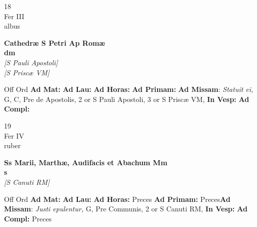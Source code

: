 \documentclass[10pt, openany]{book}
\begin{document}
        \begin{center}
            \begin{minipage}{3.5in}
                \vspace{2em}
                \begin{minipage}{0.5in}
                    {\Huge 18} \\
                    {\normalsize Fer III} \\
                    {\normalsize albus}
                \end{minipage}
                \begin{minipage}{3.0in}
                    \textbf{ \large Cathedræ S Petri Ap Romæ \\
                    \textnormal{\normalsize dm}} \\ \textit{[S Pauli Apostoli]} \\ \textit{[S Priscæ VM]} \\ 
                \end{minipage}
                \begin{justify}Off Ord
                    \textbf{Ad Mat: }
                    \textbf{Ad Lau: }
                    \textbf{Ad Horas: }
                    \textbf{Ad Primam: }\textbf{Ad Missam}: \textit{Statuit ei,} G, C, Pre de Apostolis, 2 or S Pauli Apostoli, 3 or S Priscæ VM,  
                    \textbf{In Vesp: }
                    \textbf{Ad Compl: }
                \end{justify}
            \end{minipage}
        \end{center}
    
        \begin{center}
            \begin{minipage}{3.5in}
                \vspace{2em}
                \begin{minipage}{0.5in}
                    {\Huge 19} \\
                    {\normalsize Fer IV} \\
                    {\normalsize ruber}
                \end{minipage}
                \begin{minipage}{3.0in}
                    \textbf{ \large Ss Marii, Marthæ, Audifacis et Abachum Mm \\
                    \textnormal{\normalsize s}} \\ \textit{[S Canuti RM]} \\ 
                \end{minipage}
                \begin{justify}Off Ord
                    \textbf{Ad Mat: }
                    \textbf{Ad Lau: }
                    \textbf{Ad Horas: }Preces
                    \textbf{Ad Primam: }Preces\textbf{Ad Missam}: \textit{Justi epulentur,} G, Pre Communis, 2 or S Canuti RM,  
                    \textbf{In Vesp: }
                    \textbf{Ad Compl: }Preces
                \end{justify}
            \end{minipage}
        \end{center}
    
\end{document}
